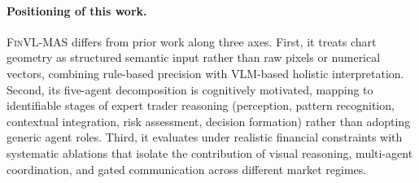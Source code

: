 \paragraph{Positioning of this work.}
\textsc{FinVL-MAS} differs from prior work along three axes. First, it treats chart geometry as structured semantic input rather than raw pixels or numerical vectors, combining rule-based precision with VLM-based holistic interpretation. Second, its five-agent decomposition is cognitively motivated, mapping to identifiable stages of expert trader reasoning (perception, pattern recognition, contextual integration, risk assessment, decision formation) rather than adopting generic agent roles. Third, it evaluates under realistic financial constraints with systematic ablations that isolate the contribution of visual reasoning, multi-agent coordination, and gated communication across different market regimes.
